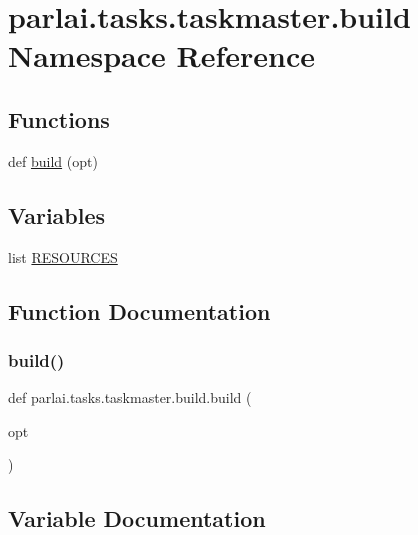 \hypertarget{namespaceparlai_1_1tasks_1_1taskmaster_1_1build}{}\section{parlai.\+tasks.\+taskmaster.\+build Namespace Reference}
\label{namespaceparlai_1_1tasks_1_1taskmaster_1_1build}
\subsection*{Functions}
\begin{DoxyCompactItemize}
\item 
def \hyperlink{namespaceparlai_1_1tasks_1_1taskmaster_1_1build_a9a432c354754067775ff8c419e2e4ffe}{build} (opt)
\end{DoxyCompactItemize}
\subsection*{Variables}
\begin{DoxyCompactItemize}
\item 
list \hyperlink{namespaceparlai_1_1tasks_1_1taskmaster_1_1build_adf6b633cc9837f5d4b462f00c5e56e49}{R\+E\+S\+O\+U\+R\+C\+ES}
\end{DoxyCompactItemize}


\subsection{Function Documentation}
\mbox{\label{namespaceparlai_1_1tasks_1_1taskmaster_1_1build_a9a432c354754067775ff8c419e2e4ffe}} 
\subsubsection{\texorpdfstring{build()}{build()}}
{\footnotesize\ttfamily def parlai.\+tasks.\+taskmaster.\+build.\+build (\begin{DoxyParamCaption}\item[{}]{opt }\end{DoxyParamCaption})}



\subsection{Variable Documentation}
\mbox{\label{namespaceparlai_1_1tasks_1_1taskmaster_1_1build_adf6b633cc9837f5d4b462f00c5e56e49}} 
